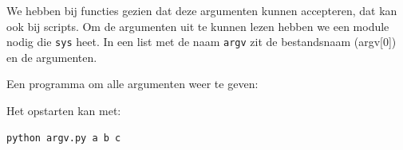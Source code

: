 We hebben bij functies gezien dat deze argumenten kunnen accepteren, dat kan ook bij scripts. Om de argumenten uit te kunnen lezen hebben we een module nodig die \texttt{sys} heet. In een list met de naam \texttt{argv} zit de bestandsnaam (argv[0]) en de argumenten.

Een programma om alle argumenten weer te geven:


Het opstarten kan met:
\begin{lstlisting}[language=bash]
python argv.py a b c
\end{lstlisting}
